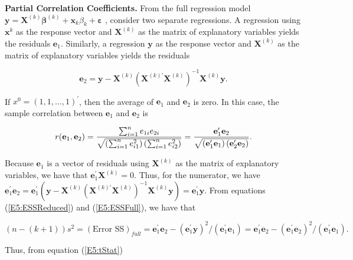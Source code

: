 \textbf{Partial Correlation Coefficients.} From the full regression model $%
\mathbf{y}=\mathbf{X}^{(k)}\boldsymbol \beta^{(k)}+\mathbf{x}_{k}\beta _{k}+\boldsymbol \varepsilon$%
, consider two separate regressions. A regression using
$\mathbf{x}^{k}$ as the response vector and $\mathbf{X}^{(k)}$ as
the matrix of explanatory variables yields the residuals
$\mathbf{e}_{1}$. Similarly, a regression $\mathbf{y}$ as the response vector and $%
\mathbf{X}^{(k)}$ as the matrix of explanatory variables yields the
residuals
\begin{center}
\[
\mathbf{e}_{2}=\mathbf{y}-\mathbf{X}^{(k)}\left(
\mathbf{X}^{(k)\prime }\mathbf{X}^{(k)}\right)
^{-1}\mathbf{X}^{(k)}\mathbf{y.}
\]
\end{center}
If $x^{0}=(1,1,\ldots,1)^{\prime}$, then the average of $%
\mathbf{e}_{1}$ and $\mathbf{e}_{2}$ is zero. In this case, the
sample correlation between $\mathbf{e}_{1}$ and $\mathbf{e}_{2}$ is
\begin{center}
\[
r(\mathbf{e}_{1},\mathbf{e}_{2})=\frac{\sum_{i=1}^{n}e_{1i}%
e_{2i}}{\sqrt{\left( \sum_{i=1}^{n}e_{i1}^{2}\right) \left(
\sum_{i=1}^{n}e_{i2}^{2}\right) }}=\frac{\mathbf{e}_{1}^{\prime }%
\mathbf{e}_{2}}{\sqrt{\left( \mathbf{e}_{1}^{\prime }\mathbf{%
e}_{1}\right) \left( \mathbf{e}_{2}^{\prime }\mathbf{e}%
_{2}\right) }}.
\]%
\end{center}
Because $\mathbf{e}_{1}$ is a vector of residuals using $\mathbf{X}%
^{(k)}$ as the matrix of explanatory variables, we have that
$\mathbf{e}_{1}^{\prime }\mathbf{X}^{(k)}=0$. Thus, for the
numerator, we have
\newline $\mathbf{e}_{1}^{\prime }\mathbf{e}_{2}=%
\mathbf{e}_{1}^{\prime }\left( \mathbf{y}-\mathbf{X}^{(k)}\left(
\mathbf{X}^{(k)\prime }\mathbf{X}^{(k)}\right) ^{-1}\mathbf{X}^{(k)}\mathbf{y%
}\right) =\mathbf{e}_{1}^{\prime }\mathbf{y.}$ From equations
(\ref{E5:ESSReduced}) and (\ref{E5:ESSFull}), we have that
\begin{center}
\[
(n-(k+1))s^{2}=(\text{Error SS})_{full}=\mathbf{e}_{1}^{\prime }%
\mathbf{e}_{2}-\left( \mathbf{e}_{1}^{\prime }\mathbf{y}\right)
^{2}/\left( \mathbf{e}_{1}^{\prime }\mathbf{e}_{1}\right) =%
\mathbf{e}_{1}^{\prime }\mathbf{e}_{2}-\left( \mathbf{e}%
_{1}^{\prime }\mathbf{e}_{2}\right) ^{2}/\left( \mathbf{e}%
_{1}^{\prime }\mathbf{e}_{1}\right).
\]
\end{center}
Thus, from equation (\ref{E5:tStat})
